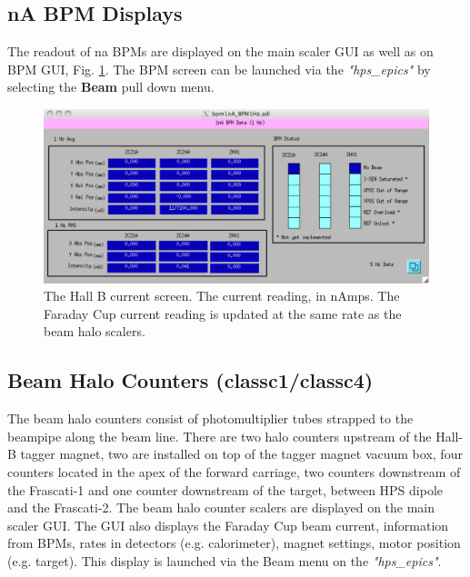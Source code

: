 \documentclass[12pt]{article}
\begin{document}
\subsection{nA BPM Displays}

The readout of na BPMs are displayed on the main scaler GUI as well as on BPM GUI, Fig. \ref{fig:bpm}. The BPM screen can be launched
via the \emph{"hps\_epics"} by selecting the \textbf{Beam}
pull down menu.
\begin{figure}[tbhp]
{\centering \includegraphics[scale=0.5]{bpms.pdf} \par}
\caption{The Hall B current screen. The current reading, in nAmps. The Faraday Cup current
reading is updated at the same rate as the beam halo scalers. \label{fig:bpm}}
\end{figure}

\subsection{Beam Halo Counters (classc1/classc4) \label{sec:scaler_a}}

The beam halo counters consist of photomultiplier tubes strapped to the beampipe along the beam line. There are two halo counters 
upstream of the Hall-B tagger magnet, two are installed on top of the tagger magnet vacuum box, four counters located in the apex of the forward carriage, two counters
downstream of the Frascati-1 and one counter downstream of the target, between HPS dipole and the Frascati-2. The beam halo counter scalers are displayed on the main scaler GUI. The GUI also
displays the Faraday Cup beam current, information from BPMs, rates in detectors (e.g. calorimeter), magnet settings, motor position (e.g. target). This display is launched via the Beam menu on the \emph{"hps\_epics"}.
\end{document}
